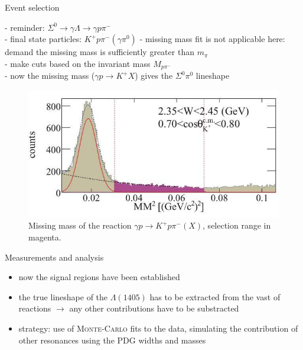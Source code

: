 \documentclass[11pt,aspectratio=1610,dvipsnames]{beamer}
\begin{document}
\begin{frame}{Event selection}
	\begin{minipage}{\linewidth}
		\begin{tcolorbox}[colback=black!10,colframe=gray!20!black,title=extracting $\Sigma^0\pi^0$] 
			- reminder: $\Sigma^0\to\gamma\Lambda\to\gamma p \pi^-$\\
			- final state particles: $K^+ p \pi^-(\gamma\pi^0)$
			- missing mass fit is not applicable here: \phantom{- }demand the missing mass is sufficiently greater than $m_\pi$\\
			- make cuts based on the invariant mass $M_{p\pi^-}$\\
			- now the missing mass ($\gamma p\to K^+ X$) gives the $\Sigma^0\pi^0$ lineshape
		\end{tcolorbox}	
	\end{minipage}
\begin{figure}
	\centering
	\includegraphics[width=.5\linewidth]{mism}
	\caption*{Missing  mass of the reaction $\gamma p \to K^+p\pi^-(X)$, selection range in magenta.  \citet{lineshapes}}
\end{figure}
\end{frame}




\begin{frame}{Measurements and analysis}
	\begin{itemize}
		\item now the signal regions have been established
		\item the true lineshape of the $\Lambda(1405)$ has to be extracted from the vast of reactions $\to$ any other contributions have to be substracted
		\item strategy: use of \textsc{Monte-Carlo} fits to the data, simulating the contribution of other resonances using the PDG widths and masses
		
	\end{itemize}
\end{frame}
\end{document}
